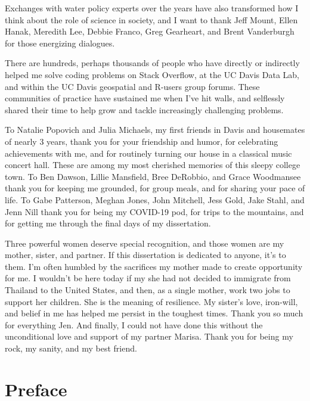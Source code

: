 \begin{frontmatter}
\begin{acknowledgments}
Exchanges with water policy experts over the years have also transformed how I think about the role of science in society, and I want to thank Jeff Mount, Ellen Hanak, Meredith Lee, Debbie Franco, Greg Gearheart, and Brent Vanderburgh for those energizing dialogues.

There are hundreds, perhaps thousands of people who have directly or indirectly helped me solve coding problems on Stack Overflow, at the UC Davis Data Lab, and within the UC Davis geospatial and R-users group forums. These communities of practice have sustained me when I've hit walls, and selflessly shared their time to help grow and tackle increasingly challenging problems.

To Natalie Popovich and Julia Michaels, my first friends in Davis and housemates of nearly 3 years, thank you for your friendship and humor, for celebrating achievements with me, and for routinely turning our house in a classical music concert hall. These are among my most cherished memories of this sleepy college town. To Ben Dawson, Lillie Mansfield, Bree DeRobbio, and Grace Woodmansee thank you for keeping me grounded, for group meals, and for sharing your pace of life. To Gabe Patterson, Meghan Jones, John Mitchell, Jess Gold, Jake Stahl, and Jenn Nill thank you for being my COVID-19 pod, for trips to the mountains, and for getting me through the final days of my dissertation. 

Three powerful women deserve special recognition, and those women are my mother, sister, and partner. If this dissertation is dedicated to anyone, it's to them. I'm often humbled by the sacrifices my mother made to create opportunity for me. I wouldn't be here today if my she had not decided to immigrate from Thailand to the United States, and then, as a single mother, work two jobs to support her children. She is the meaning of resilience. My sister's love, iron-will, and belief in me has helped me persist in the toughest times. Thank you so much for everything Jen. And finally, I could not have done this without the unconditional love and support of my partner Marisa. Thank you for being my rock, my sanity, and my best friend. 





\end{acknowledgments}

\chapter*{Preface}



\end{frontmatter}
